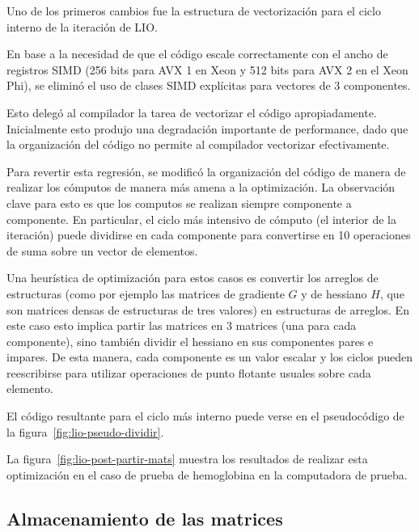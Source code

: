 Uno de los primeros cambios fue la estructura de vectorizaci\'on para el ciclo 
interno de la iteraci\'on de LIO.

En base a la necesidad de que el c\'odigo escale correctamente con el ancho de registros
SIMD (256 bits para AVX 1 en Xeon y 512 bits para AVX 2 en el Xeon Phi), se elimin\'o el
uso de clases SIMD expl\'icitas para vectores de 3 componentes. 

Esto deleg\'o al compilador la tarea de vectorizar el c\'odigo apropiadamente. Inicialmente
esto produjo una degradaci\'on importante de performance, dado que la organizaci\'on del
c\'odigo no permite al compilador vectorizar efectivamente. 

Para revertir esta regresi\'on, se modific\'o la organizaci\'on del c\'odigo de manera de
realizar los c\'omputos de manera m\'as amena a la optimizaci\'on. La observaci\'on clave
para esto es que los computos se realizan siempre componente a componente. En particular,
el ciclo m\'as intensivo de c\'omputo (el interior de la iteraci\'on) puede dividirse
en cada componente para convertirse en 10 operaciones de suma sobre un vector de
elementos. 

Una heur\'istica de optimizaci\'on para estos casos es convertir los arreglos de
estructuras (como por ejemplo las matrices de gradiente $G$ y de hessiano $H$, que
son matrices densas de estructuras de tres valores) en estructuras de arreglos.
En este caso esto implica partir las matrices en 3 matrices (una para cada
componente), sino tambi\'en dividir el hessiano en sus componentes pares e impares.
De esta manera, cada componente es un valor escalar y los ciclos pueden reescribirse
para utilizar operaciones de punto flotante usuales sobre cada elemento.

El c\'odigo resultante para el ciclo m\'as interno puede verse en el pseudoc\'odigo
de la figura~\ref{fig:lio-pseudo-dividir}. 


La figura~\ref{fig:lio-post-partir-mats} muestra los resultados de realizar esta
optimizaci\'on en el caso de prueba de hemoglobina en la computadora de prueba.


\subsection{Almacenamiento de las matrices}

